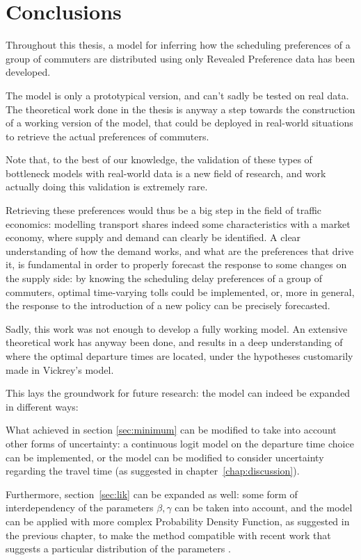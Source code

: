 \chapter{Conclusions}
\label{chap:conclusion}

Throughout this thesis, a model for inferring how the scheduling preferences of a group of commuters are distributed using only Revealed Preference data has been developed.

The model is only a prototypical version, and can't sadly be tested on real data.
The theoretical work done in the thesis is anyway a step towards the construction of a working version of the model,
that could be deployed in real-world situations to retrieve the actual preferences of commuters.

Note that, to the best of our knowledge,
the validation of these types of bottleneck models with real-world data is a new field of research,
and work actually doing this validation is extremely rare.

Retrieving these preferences would thus be a big step in the field of traffic economics:
modelling transport shares indeed some characteristics with a market economy,
where supply and demand can clearly be identified.
A clear understanding of how the demand works, and what are the preferences that drive it,
is fundamental in order to properly forecast the response to some changes on the supply side:
by knowing the scheduling delay preferences of a group of commuters,
optimal time-varying tolls could be implemented,
or, more in general, the response to the introduction of a new policy can be precisely forecasted.

Sadly, this work was not enough to develop a fully working model.
An extensive theoretical work has anyway been done,
and results in a deep understanding of where the optimal departure times are located,
under the hypotheses customarily made in Vickrey's model.

This lays the groundwork for future research:
the model can indeed be expanded in different ways:

What achieved in section \ref{sec:minimum} can be modified to take into account other forms of uncertainty:
a continuous logit model on the departure time choice can be implemented,
or the model can be modified to consider uncertainty regarding the travel time (as suggested in chapter~\ref{chap:discussion}).

Furthermore, section~\ref{sec:lik} can be expanded as well:
some form of interdependency of the parameters \(\beta, \gamma\) can be taken into account,
and the model can be applied with more complex Probability Density Function,
as suggested in the previous chapter,
to make the method compatible with recent work that suggests a particular distribution of the parameters \parencite{https://doi.org/10.1111/iere.12692}.

